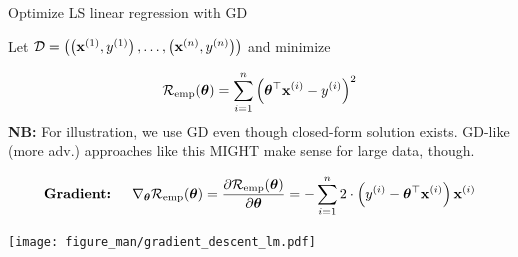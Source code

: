 \documentclass[11pt,compress,t,notes=noshow, xcolor=table]{beamer}
\begin{document}


\begin{vbframe}{Optimize LS linear regression with GD}

	\begin{footnotesize}

	Let $\mathcal{D} = \left( \left(\mathbf{x}^{(1)}, y^{(1)}\right), \ldots, \left(\mathbf{x}^{(n)}, y^{(n)}\right)\right)$ and minimize 

	$$
		\mathcal{R}_{\text{emp}}(\bm{\theta}) = \sum\limits_{i=1}^n \left(\bm{\theta}^\top \mathbf{x}^{(i)} - y^{(i)}\right)^2
	$$
	\textbf{NB: } For illustration, we use GD even though closed-form solution exists. GD-like (more adv.) approaches like this MIGHT make sense for large data, though.
	\end{footnotesize}
	
	\begin{footnotesize}
	\begin{eqnarray*}
	\textbf{Gradient: } && \nabla_{\bm{\theta}}\mathcal{R}_{\text{emp}}(\bm{\theta}) =  \frac{\partial \mathcal{R}_{\text{emp}}(\bm{\theta})}{\partial
	\bm{\theta}} = - \sum_{i=1}^n 2 \cdot \left(y^{(i)} - \bm{\theta}^{\top} \mathbf{x}^{(i)}\right) \mathbf{x}^{(i)} \\
	\end{eqnarray*}
	\end{footnotesize}


	\vspace*{-0.5cm}

	\begin{center}
	\texttt{[image: figure\_man/gradient\_descent\_lm.pdf]}
	\end{center}

\end{vbframe}
\end{document}
